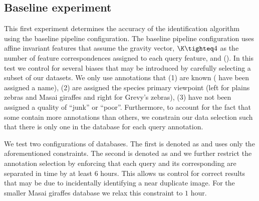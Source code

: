     \subsection{Baseline experiment}\label{sub:exptbase}

        This first experiment determines the accuracy of the
          identification algorithm using the baseline pipeline
          configuration.
        The baseline pipeline configuration uses affine invariant
          features that assume the gravity vector, $\K\tighteq4$ as the
          number of feature correspondences assigned to each query
          feature, and \nscoring{} (\nsum{}).
        In this test we control for several biases that may be
          introduced by carefully selecting a subset of our datasets.
        We only use annotations that
        (1) are known (\ie{} have been assigned a name),
        (2) are assigned the species primary viewpoint (left for plains
          zebras and Masai giraffes and right for Grevy's zebras),
        (3) have not been assigned a quality of ``junk'' or ``poor''.
        Furthermore, to account for the fact that some \names{} contain
          more annotations than others, we constrain our data selection
          such that there is only one \groundtrue{} \exemplar{} in the
          database for each query annotation.

        We test two configurations of databases.
        The first is denoted as \ctrl{} and uses only the
          aforementioned constraints.
        The second is denoted as \timectrl{} and we further restrict
          the annotation selection by enforcing that each query and its
          corresponding \groundtrue{} \exemplar{} are separated in time
          by at least $6$ hours.
        This allows us control for correct results that may be due to
          incidentally identifying a near duplicate image.
        For the smaller Masai giraffes database we relax this
          constraint to $1$ hour.

